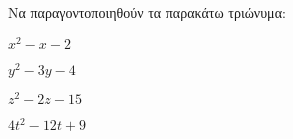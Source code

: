 Να παραγοντοποιηθούν τα παρακάτω τριώνυμα:
\begin{multicols}{2}
\begin{alist}
\item $ x^2-x-2 $
\item $ y^2-3y-4 $
\item $ z^2-2z-15 $
\item $ 4t^2-12t+9 $
\end{alist}
\end{multicols}
